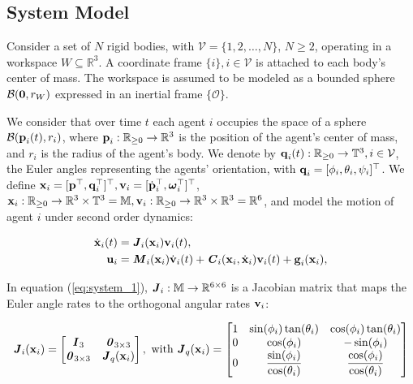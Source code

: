 \subsection{System Model}

Consider a set of $N$ rigid bodies, with $\mathcal{V} = \{ 1,2, \ldots, N\}$,
$N  \geq 2$, operating in a workspace $W\subseteq \mathbb{R}^3$.
A coordinate frame $\{i\}, i\in\mathcal{V}$ is attached to each body's
center of mass. The workspace is assumed to be modeled as a
bounded sphere $\mathcal{B}(\bm{\mathbf{0}},r_W)$ expressed in an inertial frame
$\{\mathcal{O}\}$.

We consider that over time $t$ each agent $i$ occupies the space of a sphere
$\mathcal{B}(\bm{\mathbf{p}}_i(t), r_i)$, where $\bm{\mathbf{p}}_i : \mathbb{R}_{\geq 0} \to \mathbb{R}^3$
is the position of the agent's center of mass, and $r_i$ is the radius of the
agent's body. We denote by $\bm{\mathbf{q}}_i(t):\mathbb{R}_{\geq 0} \to \mathbb{T}^3, i\in\mathcal{V}$,
the Euler angles representing the agents' orientation,
with $\bm{\mathbf{q}}_i = [\phi_i,\theta_i,\psi_i]^{\top}$.
We define $\bm{\mathbf{x}}_i = [\bm{\mathbf{p}}^{\top},\bm{\mathbf{q}}^{\top}_i]^{\top},
\bm{\mathbf{v}}_i =[\dot{\bm{\mathbf{p}}}^{\top}_i, \bm{\mathbf{\omega}}^{\top}_i]^{\top}$,
$\bm{\mathbf{x}}_i:\mathbb{R}_{\geq 0} \to \mathbb{R}^3\times \mathbb{T}^3 =
\mathbb{M}, \bm{\mathbf{v}}_i : \mathbb{R}_{\geq 0} \to \mathbb{R}^3\times \mathbb{R}^3
= \mathbb{R}^6$, and model the motion of agent $i$ under second order dynamics:

\begin{subequations}
	\begin{align}
    \dot{\bm{\mathbf{x}}}_i(t) &= \bm{\mathit{J}}_i(\bm{\mathbf{x}}_i) \bm{\mathbf{v}}_i(t), \label{eq:system_1} \\
    \bm{\mathbf{u}}_i &= \bm{\mathit{M}}_i(\bm{\mathbf{x}}_i) \dot{\bm{\mathbf{v}}}_i(t) + \bm{\mathit{C}}_i(\bm{\mathbf{x}}_i,\dot{\bm{\mathbf{x}}}_i) \bm{\mathbf{v}}_i(t)+\bm{\mathbf{g}}_i(\bm{\mathbf{x}}_i), \label{eq:system_2}
	\end{align}
  \label{eq:system}
\end{subequations}

In equation (\ref{eq:system_1}), $\bm{\mathit{J}}_i:\mathbb{M} \to \mathbb{R}^{6\times6}$ is
a Jacobian matrix that maps the Euler angle rates to the orthogonal angular
rates $\bm{\mathbf{v}}_i$:

\begin{equation}
  \bm{\mathit{J}}_i(\bm{\mathbf{x}}_i) =
  \begin{bmatrix}
    \bm{\mathit{I}}_3 & \bm{\mathit{0}}_{3 \times 3} \\
    \bm{\mathit{0}}_{3 \times 3} & \bm{\mathit{J}}_{ q }(\bm{\mathbf{x}}_i) \\
  \end{bmatrix} \notag, \text{ with }
  \bm{\mathit{J}}_q(\bm{\mathbf{x}}_i) =
  \begin{bmatrix}
  1 & \sin(\phi_i) \tan(\theta_i)  & \cos(\phi_i) \tan(\theta_i) \\
  0 & \cos(\phi_i) & -\sin(\phi_i) \\
  0  & \displaystyle \frac{\sin(\phi_i)}{\cos(\theta_i)} & \displaystyle \frac{\cos(\phi_i)}{\cos(\theta_i)}
  \end{bmatrix} \notag
\end{equation}

